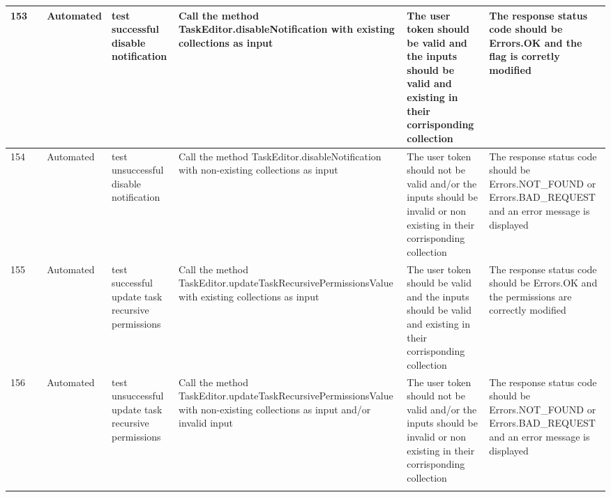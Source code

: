 \documentclass{article}
\begin{document}
{\begin{tabular}{|
    >{\columncolor[HTML]{FFFFFF}}l |
    >{\columncolor[HTML]{FFFFFF}}c |
    >{\columncolor[HTML]{FFFFFF}}l |l|l|l|l|}
    153                                 & \cellcolor[HTML]{FFFFFF}                                    & {\color[HTML]{11734B} Automated} & test successful disable notification                & Call the method TaskEditor.disableNotification with existing collections as input                                          & The user token should be valid and the inputs should be valid and existing in their corrisponding collection                                             & The response status code should be Errors.OK and the flag is corretly modified                                \\ \cline{1-1} \cline{3-7} 
    154                                 & \cellcolor[HTML]{FFFFFF}                                    & {\color[HTML]{11734B} Automated} & test unsuccessful disable notification              & Call the method TaskEditor.disableNotification with non-existing collections as input                                      & The user token should not be valid and/or the inputs should be invalid or non existing in their corrisponding collection                                 & The response status code should be Errors.NOT\_FOUND or Errors.BAD\_REQUEST and an error message is displayed \\ \cline{1-1} \cline{3-7} 
    155                                 & \cellcolor[HTML]{FFFFFF}                                    & {\color[HTML]{11734B} Automated} & test successful update task recursive permissions   & Call the method TaskEditor.updateTaskRecursivePermissionsValue with existing collections as input                          & The user token should be valid and the inputs should be valid and existing in their corrisponding collection                                             & The response status code should be Errors.OK and the permissions are correctly modified                       \\ \cline{1-1} \cline{3-7} 
    156                                 & \cellcolor[HTML]{FFFFFF}                                    & {\color[HTML]{11734B} Automated} & test unsuccessful update task recursive permissions & Call the method TaskEditor.updateTaskRecursivePermissionsValue with non-existing collections as input and/or invalid input & The user token should not be valid and/or the inputs should be invalid or non existing in their corrisponding collection                                 & The response status code should be Errors.NOT\_FOUND or Errors.BAD\_REQUEST and an error message is displayed \\ \cline{1-1} \cline{3-7} 

\end{tabular}}
\end{document}

